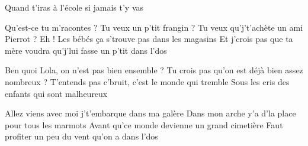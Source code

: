 Quand t'iras à l'école si jamais t'y vas
\endverse

\beginverse
Qu'est-ce tu m'racontes ? Tu veux un p'tit frangin ?
Tu veux qu'j't'achète un ami Pierrot ?
Eh ! Les bébés ça s'trouve pas dans les magasins
Et j'crois pas que ta mère voudra qu'j'lui fasse un p'tit dans l'dos

Ben quoi Lola, on n'est pas bien ensemble ?
Tu crois pas qu'on est déjà bien assez nombreux ?
T'entends pas c'bruit, c'est le monde qui tremble
Sous les cris des enfants qui sont malheureux

Allez viens avec moi j't'embarque dans ma galère
Dans mon arche y'a d'la place pour tous les marmots
Avant qu'ce monde devienne un grand cimetière
Faut profiter un peu du vent qu'on a dans l'dos
\endverse

\endsong

\]\]\]\]\]\]\]\]\]\]\]\]\]\]\]\]\]\]\]\]\]\]\]\]\]\]\]\]\]\]\]\]\]\]\]\]\]\]\]\]\]\]\]\]\]\]\]\]\]\]\]\]\]\]\]\]\]\]\]\]\]\]\]\]\]\]\]\]\]\]\]\]\]\]\]\]\]\]\]\]\]\]\]\]\]\]\]\]\]\]\]\]\]\]\]\]\]\]\]\]\]\]\]\]\]\]\]\]\]\]\]\]\]\]\]\]\]\]\]\]\]\]\]\]\]\]\]\]\]\]\]\]\]\]\]\]\]\]\]\]\]\]\]\]\]\]\]\]\]\]\]\]\]\]\]\]\]\]\]\]\]\]\]\]\]\]\]\]\]\]\]\]\]\]\]\]\]\]\]\]\]\]\]\]\]\]\]\]\]\]\]\]\]\]\]\]\]\]\]\]\]\]\]\]\]\]\]\]\]\]\]\]\]\]\]\]\]\]\]\]\]\]\]\]\]\]\]\]\]\]\]\]\]\]\]\]\]\]\]\]\]\]\]\]\]\]\]\]\]\]\]\]\]\]\]\]\]\]\]\]\]\]\]\]\]\]\]\]\]\]\]\]\]\]\]\]\]\]\]\]\]\]\]\]\]\]\]\]\]\]\]\]\]\]\]\]\]\]\]\]\]\]\]\]\]\]\]\]\]\]\]\]\]\]\]\]\]\]\]\]\]\]\]\]\]\]\]\]\]\]\]\]\]\]\]\]\]\]\]\]\]\]\]\]\]\]\]\]\]\]\]\]\]\]\]\]\]\]\]\]\]\]\]\]\]\]\]\]\]\]\]\]\]\]\]\]\]\]\]\]\]\]\]\]\]\]\]\]\]\]\]\]\]\]\]\]\]\]\]\]\]\]\]\]\]\]\]\]\]\]\]\]\]\]\]\]\]\]\]\]\]\]\]\]\]\]\]\]\]\]\]\]\]\]\]\]\]\]\]\]\]\]\]\]\]\]\]\]\]\]\]\]\]\]\]\]\]\]\]\]\]\]\]\]\]\]\]\]\]\]\]\]\]\]\]\]\]\]\]\]\]\]\]\]\]\]\]\]\]\]\]\]\]\]\]\]\]\]\]\]\]\]\]\]\]\]\]\]\]\]\]\]\]\]\]\]\]\]\]\]\]\]\]\]\]\]\]\]\]\]\]\]\]\]\]\]\]\]\]\]\]\]\]\]\]\]\]\]\]\]\]\]\]\]\]\]\]\]\]\]\]\]\]\]\]\]\]\]\]\]\]\]\]\]\]\]\]\]\]\]\]\]\]\]\]\]\]\]\]\]\]\]\]\]\]\]\]\]\]\]\]\]\]\]\]\]\]\]\]\]\]\]\]\]\]\]\]\]\]\]\]\]\]\]\]\]\]\]\]\]\]\]\]\]\]\]\]\]\]\]\]\]\]\]\]\]\]\]\]\]\]\]\]\]\]\]\]\]\]\]\]\]\]\]\]\]\]\]\]\]\]\]\]\]\]\]\]\]\]\]\]\]\]\]\]\]\]\]\]\]\]\]\]\]\]\]\]\]\]\]\]\]\]\]\]\]\]\]\]\]\]\]\]\]\]\]\]\]\]\]\]\]\]\]\]\]\]\]\]\]\]\]\]\]\]\]\]\]\]\]\]\]\]\]\]\]\]\]\]\]\]\]\]\]\]\]\]\]\]\]\]\]\]\]\]\]\]\]\]\]\]\]\]\]\]\]\]\]\]\]\]\]\]\]\]\]\]\]\]\]\]\]\]\]\]\]\]\]\]\]\]\]\]\]\]\]\]\]\]\]\]\]\]\]\]\]\]\]\]\]\]\]\]\]\]\]\]\]\]\]\]\]\]\]\]\]\]\]\]\]\]\]\]\]\]\]\]\]\]\]\]\]\]\]\]\]\]\]\]\]\]\]\]\]\]\]\]\]\]\]\]\]\]\]\]\]\]\]\]\]\]\]\]\]\]\]\]\]\]\]\]\]\]\]\]\]\]\]\]\]\]\]\]\]\]\]\]\]\]\]\]\]\]\]\]\]\]\]\]\]\]\]\]\]\]\]\]\]\]\]\]\]\]\]\]\]\]\]\]\]\]\]\]\]\]\]\]\]\]\]\]\]\]\]\]\]\]\]\]\]\]\]\]\]\]\]\]\]\]\]\]\]\]\]\]\]\]\]\]\]\]\]\]\]\]\]\]\]\]\]\]\]\]\]\]\]\]\]\]\]\]\]\]\]\]\]\]\]\]\]\]\]\]\]\]\]\]\]\]\]\]\]\]\]\]\]\]\]\]\]\]\]\]\]\]\]\]\]\]\]\]\]\]\]\]\]\]\]\]\]\]\]\]\]\]\]\]\]\]\]\]\]\]\]\]\]\]\]\]\]\]\]\]\]\]\]\]\]\]\]\]\]\]\]\]\]\]\]\]\]\]\]\]\]\]\]\]\]\]\]\]\]\]\]\]\]\]\]\]\]\]\]\]\]\]\]\]\]\]\]\]\]\]\]\]\]\]\]\]\]\]\]\]\]\]\]\]\]\]\]\]\]\]\]\]\]\]\]\]\]\]\]\]\]\]\]\]\]\]\]\]\]\]\]\]\]\]\]\]\]\]\]\]\]\]\]\]\]\]\]\]\]\]\]\]\]\]\]\]\]\]\]\]\]\]\]\]\]\]\]\]\]\]\]\]\]\]\]\]\]\]\]\]\]\]\]\]\]\]\]\]\]\]\]\]\]\]\]\]\]\]\]\]\]\]\]\]\]\]\]\]\]
